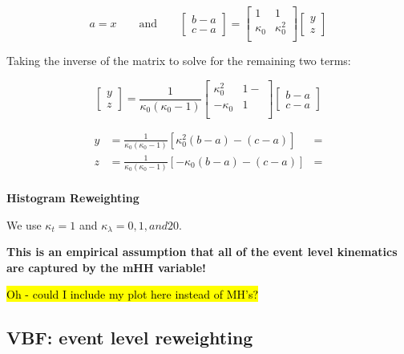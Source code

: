 \begin{equation}
a = x
%
\qquad \text{and} \qquad
%
\begin{bmatrix} 
b - a \\ c-a
\end{bmatrix}
 = \begin{bmatrix} 
	1 & 1\\
	\kappa_0 & \kappa_0^2 \\
\end{bmatrix}
\begin{bmatrix} 
y \\ z
\end{bmatrix}
\end{equation}

Taking the inverse of the matrix to solve for the remaining two terms:

\begin{equation}
\begin{bmatrix} 
y \\ z
\end{bmatrix}
 = \frac{1}{\kappa_0 (\kappa_0 - 1)} \begin{bmatrix} 
	\kappa_0^2  & 1-\\
	-\kappa_0 & 1 \\
\end{bmatrix}
\begin{bmatrix} 
b-a \\ c-a
\end{bmatrix}
\end{equation}


\begin{align}
y &=  \frac{1}{\kappa_0 (\kappa_0 - 1)} \left[  \kappa_0^2 (b-a) - (c-a) \right]  &=  \\
z &=   \frac{1}{\kappa_0 (\kappa_0 - 1)} \left[ - \kappa_0 (b-a) - (c-a)  \right]  &= \\
\end{align}

\textbf{Histogram Reweighting}

We use $\kappa_t = 1$ and $\kappa_\lambda = 0, 1, and 20$.

\textbf{This is an empirical assumption that all of the event level kinematics are \textbf{captured} by the mHH variable!}

\hl{Oh - could I include my plot here instead of MH's?}

\subsection{VBF: event level reweighting}

